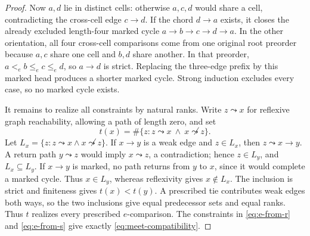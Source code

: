 \begin{proof}
Now \(a,d\) lie in distinct cells: otherwise \(a,c,d\) would share a cell,
contradicting the cross-cell edge \(c\to d\).  If the chord \(d\to a\) exists,
it closes the already excluded length-four marked cycle
\(a\to b\to c\to d\to a\).  In the other orientation, all four cross-cell
comparisons come from one original root preorder because \(a,c\) share one
cell and \(b,d\) share another.  In that preorder,
\(a<_e b\le_e c\le_e d\), so \(a\to d\) is strict.  Replacing the three-edge
prefix by this marked head produces a shorter marked cycle.  Strong induction
excludes every case, so no marked cycle exists.

It remains to realize all constraints by natural ranks.  Write \(z\leadsto x\)
for reflexive graph reachability, allowing a path of length zero, and set
\begin{equation}
 t(x)=
 \#\{z:z\leadsto x\ \land\ x\not\leadsto z\}.
 \label{eq:counting-linearization}
\end{equation}
Let \(L_x=\{z:z\leadsto x\land x\not\leadsto z\}\).  If \(x\to y\) is a weak
edge and \(z\in L_x\), then \(z\leadsto x\to y\).  A return path
\(y\leadsto z\) would imply \(x\leadsto z\), a contradiction; hence
\(z\in L_y\), and \(L_x\subseteq L_y\).  If \(x\to y\) is marked, no path
returns from \(y\) to \(x\), since it would complete a marked cycle.  Thus
\(x\in L_y\), whereas reflexivity gives \(x\notin L_x\).  The inclusion is
strict and finiteness gives \(t(x)<t(y)\).  A prescribed tie contributes weak
edges both ways, so the two inclusions give equal predecessor sets and equal
ranks.  Thus \(t\) realizes every prescribed \(e\)-comparison.  The constraints in
\autoref{eq:e-from-r} and \autoref{eq:e-from-s} give exactly
\autoref{eq:meet-compatibility}.
\end{proof}

